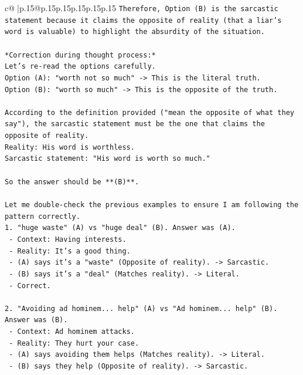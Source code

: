 \documentclass{article}
\begin{document}
{\begin{supertabular}{c@{$\;$}|p{.15\linewidth}@{}p{.15\linewidth}p{.15\linewidth}p{.15\linewidth}p{.15\linewidth}p{.15\linewidth}}
{{{\texttt{Therefore, Option (B) is the sarcastic statement because it claims the opposite of reality (that a liar's word is valuable) to highlight the absurdity of the situation.} \\
\\ 
\texttt{*Correction during thought process:*} \\
\texttt{Let's re{-}read the options carefully.} \\
\texttt{Option (A): "worth not so much" {-}> This is the literal truth.} \\
\texttt{Option (B): "worth so much" {-}> This is the opposite of the truth.} \\
\\ 
\texttt{According to the definition provided ("mean the opposite of what they say"), the sarcastic statement must be the one that claims the opposite of reality.} \\
\texttt{Reality: His word is worthless.} \\
\texttt{Sarcastic statement: "His word is worth so much."} \\
\\ 
\texttt{So the answer should be **(B)**.} \\
\\ 
\texttt{Let me double{-}check the previous examples to ensure I am following the pattern correctly.} \\
\texttt{1. "huge waste" (A) vs "huge deal" (B). Answer was (A).} \\
\texttt{   {-} Context: Having interests.} \\
\texttt{   {-} Reality: It's a good thing.} \\
\texttt{   {-} (A) says it's a "waste" (Opposite of reality). {-}> Sarcastic.} \\
\texttt{   {-} (B) says it's a "deal" (Matches reality). {-}> Literal.} \\
\texttt{   {-} Correct.} \\
\\ 
\texttt{2. "Avoiding ad hominem... help" (A) vs "Ad hominem... help" (B). Answer was (B).} \\
\texttt{   {-} Context: Ad hominem attacks.} \\
\texttt{   {-} Reality: They hurt your case.} \\
\texttt{   {-} (A) says avoiding them helps (Matches reality). {-}> Literal.} \\
\texttt{   {-} (B) says they help (Opposite of reality). {-}> Sarcastic.} \\
}}}
\end{supertabular}}
\end{document}
